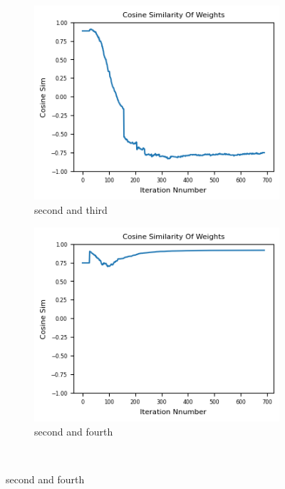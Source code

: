 \documentclass[12pt]{article}
\begin{document}
\begin{figure}[H]
\begin{subfigure}[b]{0.3\textwidth}
    \includegraphics[width=\textwidth]{Figs/1-2.png}
    \caption{second and third}
  \end{subfigure}
  \hspace*{10}
  \begin{subfigure}[b]{0.3\textwidth}
    \includegraphics[width=\textwidth]{Figs/1-3.png}
    \caption{second and fourth}
  \end{subfigure}
  \\[\smallskipamount]
 

\end{figure}
\end{document}
